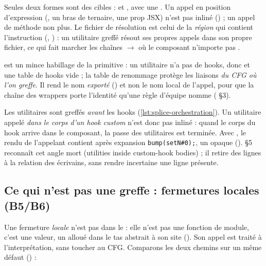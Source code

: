 
Seules deux formes sont des cibles :  et , avec  une . Un appel en position d'expression (, un bras de ternaire, une prop JSX) n'est pas inliné () ; un appel de méthode  non plus. Le fichier de résolution est celui de la \emph{région} qui contient l'instruction (, ) : un utilitaire greffé résout ses propres appels dans son propre fichier, ce qui fait marcher les chaînes  $\to$  où le composant n'importe pas .


 est un mince habillage de la primitive : un utilitaire n'a pas de hooks, donc  et une table de hooks vide ; la table de renommage protège les liaisons \emph{du CFG où l'on greffe}. Il rend le nom \emph{exporté} () et non le nom local de l'appel, pour que la chaîne des wrappers porte l'identité qu'une règle d'équipe nomme ( §3).

\begin{piege}
Les utilitaires sont greffés \emph{avant} les hooks (\cref{lst:splice-orchestration}). Un utilitaire appelé \emph{dans le corps d'un hook custom} n'est donc pas inliné : quand le corps du hook arrive dans le composant, la passe des utilitaires est terminée. Avec , le rendu de l'appelant contient après expansion \texttt{bump(setN\#0);}, un  opaque ().  §5 reconnaît cet angle mort (\og utilities inside custom-hook bodies\fg{}) ; il retire des lignes à la relation des écrivains, sans rendre incertaine une ligne présente.
\end{piege}

\subsection{Ce qui n'est pas une greffe : fermetures locales (B5/B6)}
\label{sec:splice-locales}

Une fermeture \emph{locale} n'est pas dans le  : elle n'est pas une fonction de module, c'est une valeur, un  alloué dans le tas abstrait à son site (). Son appel est traité à l'interprétation, sans toucher au CFG. Comparons les deux chemins sur un même défaut () :

